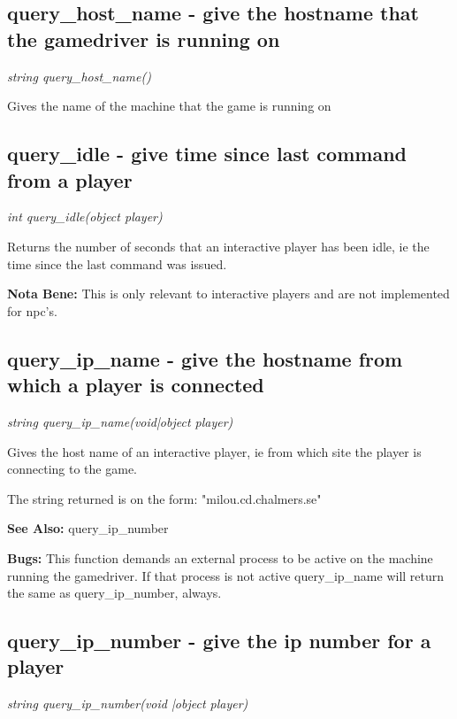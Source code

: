 \subsection{query\_host\_name - give the hostname that the gamedriver is running on}

    {\em string query\_host\_name()}

    Gives the name of the machine that the game is running on



\subsection{query\_idle - give time since last command from a player}

    {\em int query\_idle(object player)}

    Returns the number of seconds that an interactive player has been
    idle, ie the time since the last command was issued.    

    {\bf Nota Bene: }   This is only relevant to interactive players and are not implemented
    for npc's.



\subsection{query\_ip\_name - give the hostname from which a player is connected}

    {\em string query\_ip\_name(void|object player)}

    Gives the host name of an interactive player, ie from which site
    the player is connecting to the game.
    
    The string returned is on the form: "milou.cd.chalmers.se"

    {\bf See Also: }    query\_ip\_number

    {\bf Bugs: }    This function demands an external process to be active on the
    machine running the gamedriver. If that process is not active
    query\_ip\_name will return the same as query\_ip\_number, always.



\subsection{query\_ip\_number - give the ip number for a player}

    {\em string query\_ip\_number(void |object player)}


